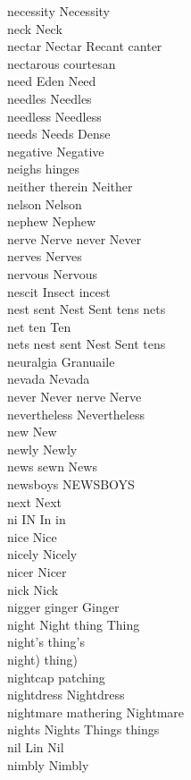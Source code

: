 necessity Necessity\\
neck Neck\\
nectar Nectar Recant canter\\
nectarous courtesan\\
need Eden Need\\
needles Needles\\
needless Needless\\
needs Needs Dense\\
negative Negative\\
neighs hinges\\
neither therein Neither\\
nelson Nelson\\
nephew Nephew\\
nerve Nerve never Never\\
nerves Nerves\\
nervous Nervous\\
nescit Insect incest\\
nest sent Nest Sent tens nets\\
net ten Ten\\
nets nest sent Nest Sent tens\\
neuralgia Granuaile\\
nevada Nevada\\
never Never nerve Nerve\\
nevertheless Nevertheless\\
new New\\
newly Newly\\
news sewn News\\
newsboys NEWSBOYS\\
next Next\\
ni IN In in\\
nice Nice\\
nicely Nicely\\
nicer Nicer\\
nick Nick\\
nigger ginger Ginger\\
night Night thing Thing\\
night's thing's\\
night) thing)\\
nightcap patching\\
nightdress Nightdress\\
nightmare mathering Nightmare\\
nights Nights Things things\\
nil Lin Nil\\
nimbly Nimbly\\

